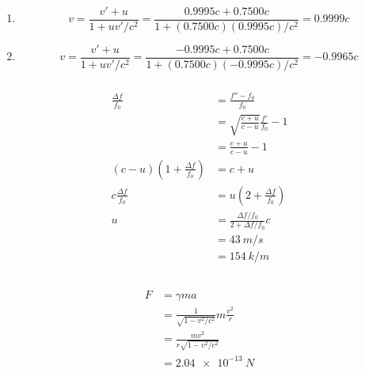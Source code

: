 \documentclass{article}
\begin{document}
\setcounter{subsubsection}{56}
\subsubsection{}

\begin{enumerate}
  \item \[v = \frac{v' + u}{1 + u v' / c^2} = \frac{0.9995 c + 0.7500 c}{1 + (0.7500 c) (0.9995 c) / c^2} = 0.9999 c\]

  \item \[v = \frac{v' + u}{1 + u v' / c^2} = \frac{-0.9995 c + 0.7500 c}{1 + (0.7500 c) (-0.9995 c) / c^2} = -0.9965 c\]
\end{enumerate}

\setcounter{subsubsection}{60}
\subsubsection{}

\begin{align*}
  \frac{\Delta f}{f_0}                            & = \frac{f'' - f_0}{f_0}                         \\
                                                  & = \sqrt{\frac{c + u}{c - u}} \frac{f'}{f_0} - 1 \\
                                                  & = \frac{c + u}{c - u} - 1                       \\
  (c - u) \left( 1 + \frac{\Delta f}{f_0} \right) & = c + u                                         \\
  c \frac{\Delta f}{f_0}                          & = u \left( 2 + \frac{\Delta f}{f_0} \right)     \\
  u                                               & = \frac{\Delta f / f_0}{2 + \Delta f / f_0} c   \\
                                                  & = \qty{43}{m/s}                                 \\
                                                  & = \qty{154}{k/m}                                \\
\end{align*}

\setcounter{subsubsection}{62}
\subsubsection{}

\begin{align*}
  F & = \gamma m a                                     \\
    & = \frac{1}{\sqrt{1 - v^2 / c^2}} m \frac{v^2}{r} \\
    & = \frac{m v^2}{r \sqrt{1 - v^2 / c^2}}           \\
    & = \qty{2.04e-13}{N}
\end{align*}
\end{document}
